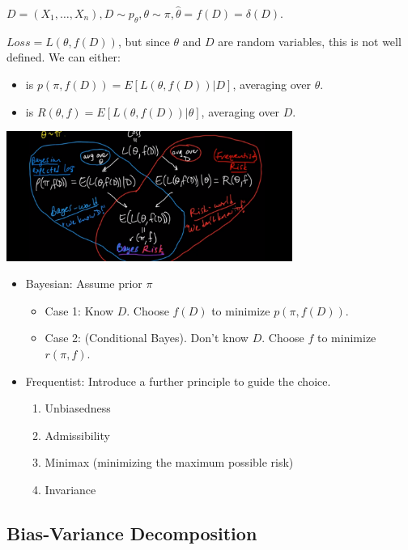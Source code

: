 $D = (X_1, \dots, X_n), D \sim p_\theta, \theta \sim \pi, \hat{\theta} = f(D) = \delta(D)$.

$Loss = L(\theta, f(D))$, but since $\theta$ and $D$ are random variables, this is not well defined. We can either:

\begin{itemize}
    \item {} is $p(\pi, f(D)) = E[L(\theta, f(D)) | D]$, averaging over $\theta$.
    \item {} is $R(\theta, f) = E[L(\theta, f(D)) | \theta]$, averaging over $D$.
\end{itemize}

\includegraphics[width=0.7\textwidth]{img/loss-and-risk}

\begin{itemize}
    \item Bayesian: Assume prior $\pi$
        \begin{itemize}
            \item Case 1: Know $D$. Choose $f(D)$ to minimize $p(\pi, f(D))$.
            \item Case 2: (Conditional Bayes). Don't know $D$. Choose $f$ to minimize $r(\pi, f)$.
        \end{itemize}
        
    \item Frequentist: Introduce a further principle to guide the choice.
        \begin{enumerate}
            \item Unbiasedness
            \item Admissibility
            \item Minimax (minimizing the maximum possible risk)
            \item Invariance
        \end{enumerate}
\end{itemize}


\subsection{Bias-Variance Decomposition}

